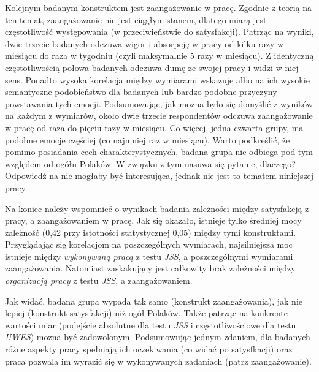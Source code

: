 Kolejnym badanym konstruktem jest zaangażowanie w pracę. Zgodnie z teorią na ten temat, zaangażowanie nie jest ciągłym stanem, dlatego miarą jest częstotliwość występowania (w przeciwieństwie do satysfakcji). Patrząc na wyniki, dwie trzecie badanych odczuwa wigor i absorpcję w pracy od kilku razy w miesiącu do raza w tygodniu (czyli maksymalnie 5 razy w miesiącu). Z identyczną częstotliwością połowa badanych odczuwa dumę ze swojej pracy i widzi w niej sens. Ponadto wysoka korelacja między wymiarami wskazuje albo na ich wysokie semantyczne podobieństwo dla badanych lub bardzo podobne przyczyny powstawania tych emocji. Podsumowując, jak można było się domyślić z wyników na każdym z wymiarów, około dwie
trzecie respondentów odczuwa zaangażowanie w pracę od raza do pięciu razy w miesiącu. Co więcej, jedna czwarta grupy, ma podobne emocje częściej (co najmniej raz w miesiącu). Warto podkreślić, że pomimo posiadania cech charakterystycznych, badana grupa nie odbiega pod tym względem od ogółu Polaków. W związku z tym nasuwa się pytanie, dlaczego? Odpowiedź na nie mogłaby być interesująca, jednak nie jest to tematem niniejszej pracy. 

Na koniec należy wspomnieć o wynikach badania zależności między satysfakcją z pracy, a zaangażowaniem w pracę. Jak się okazało, istnieje tylko średniej mocy zależność (0,42 przy istotności statystycznej 0,05) między tymi konstruktami. Przyglądając się korelacjom na poszczególnych wymiarach, najsilniejsza moc istnieje między \textit{wykonywaną pracą} z testu \emph{JSS}, a poszczególnymi wymiarami zaangażowania. Natomiast zaskakujący jest całkowity brak zależności między
\textit{organizacją pracy} z testu \emph{JSS}, a zaangażowaniem.

  Jak widać, badana grupa wypada tak samo (konstrukt zaangażowania), jak nie lepiej (konstrukt satysfakcji) niż ogół Polaków. Także patrząc na konkrente wartości miar (podejście absolutne dla testu \emph{JSS} i częstotliwościowe dla testu \emph{UWES}) można być zadowolonym. Podsumowując jednym zdaniem, dla badanych różne aspekty pracy spełniają ich oczekiwania (co widać po satysfkacji) oraz praca pozwala im wyrazić się w wykonywanych zadaniach (patrz zaangażowanie).
